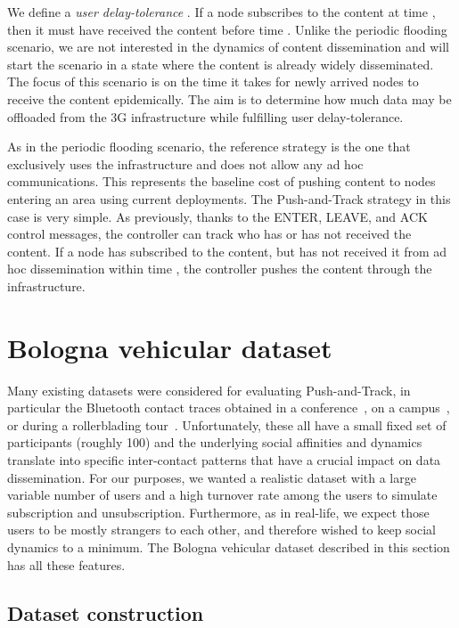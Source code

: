 \documentclass[preprint]{elsarticle}
\begin{document}
We define a \emph{user delay-tolerance} . If a node subscribes to the content at time , then it must have received the content before time . Unlike the periodic flooding scenario, we are not interested in the dynamics of content dissemination and will start the scenario in a state where the content is already widely disseminated. The focus of this scenario is on the time it takes for newly arrived nodes to receive the content epidemically. The aim is to determine how much data may be offloaded from the 3G infrastructure while fulfilling user delay-tolerance.

As in the periodic flooding scenario, the reference strategy is the one that exclusively uses the infrastructure and does not allow any ad hoc communications. This represents the baseline cost of pushing content to nodes entering an area using current deployments. The Push-and-Track strategy in this case is very simple. As previously, thanks to the \textsf{ENTER}, \textsf{LEAVE}, and \textsf{ACK} control messages, the controller can track who has or has not received the content. If a node has subscribed to the content, but has not received it from ad hoc dissemination within time , the controller pushes the content through the infrastructure.


\section{Bologna vehicular dataset}
\label{sec:dataset}

Many existing datasets were considered for evaluating Push-and-Track, in particular the Bluetooth contact traces obtained in a conference~\cite{chaintreau}, on a campus~\cite{mit}, or during a rollerblading tour~\cite{tournoux08}. Unfortunately, these all have a small fixed set of participants (roughly 100) and the underlying social affinities and dynamics translate into specific inter-contact patterns that have a crucial impact on data dissemination. For our purposes, we wanted a realistic dataset with a large variable number of users and a high turnover rate among the users to simulate subscription and unsubscription. Furthermore, as in real-life, we expect those users to be mostly strangers to each other, and therefore wished to keep social dynamics to a minimum. The Bologna vehicular dataset described in this section has all these features.

\subsection{Dataset construction}
\label{subsec:dataset_construction}
\end{document}
